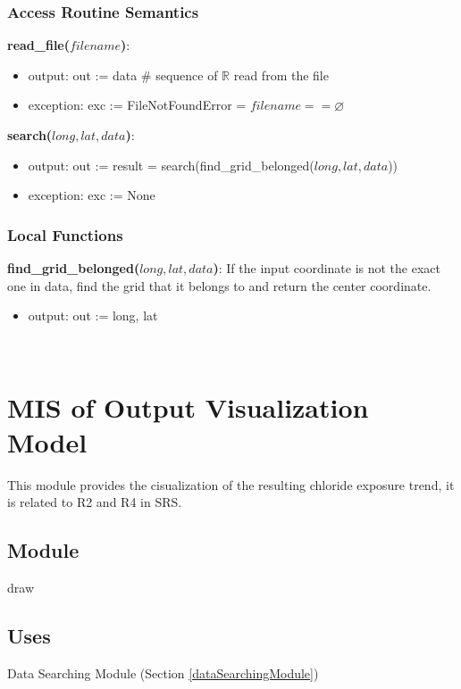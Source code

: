 \documentclass[12pt, titlepage]{article}
\begin{document}
\subsubsection{Access Routine Semantics}
\noindent \textbf{read\_file($filename$)}:
\begin{itemize}
\item output: out := data \# sequence of $\mathbb{R}$ read from the file
\item exception: exc := FileNotFoundError = $filename == \varnothing$
\end{itemize}
\noindent \textbf{search($long, lat, data$)}:
\begin{itemize}
\item output: out := result = search(find\_grid\_belonged($long, lat, data$))
\item exception: exc := None
\end{itemize}

\subsubsection{Local Functions}
\noindent \textbf{find\_grid\_belonged($long, lat, data$)}: If the input coordinate is not the exact one in data, find the grid that it belongs to and return the center coordinate.
\begin{itemize}
\item output: out := long, lat

\end{itemize}


~\newpage

\section{MIS of Output Visualization Model} \label{outputVisualizationModule}
This module provides the cisualization of the resulting chloride exposure trend, it is related to R2 and R4 in SRS.

\subsection{Module}

draw

\subsection{Uses}

Data Searching Module (Section \ref{dataSearchingModule})
\end{document}
